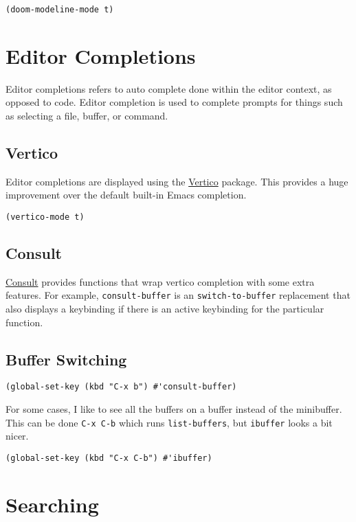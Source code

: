 \documentclass[11pt]{article}
\begin{document}
\begin{verbatim}
(doom-modeline-mode t)
\end{verbatim}
\section{Editor Completions}
\label{sec:org499d21c}

Editor completions refers to auto complete done within the editor context, as
opposed to code. Editor completion is used to complete prompts for things such
as selecting a file, buffer, or command.
\subsection{Vertico}
\label{sec:orgf2138d9}

Editor completions are displayed using the \href{https://github.com/minad/vertico}{Vertico} package. This provides a huge
improvement over the default built-in Emacs completion.

\begin{verbatim}
(vertico-mode t)
\end{verbatim}
\subsection{Consult}
\label{sec:org481e10d}

\href{https://github.com/minad/consult}{Consult} provides functions that wrap vertico completion with some extra
features. For example, \texttt{consult-buffer} is an \texttt{switch-to-buffer} replacement
that also displays a keybinding if there is an active keybinding for the
particular function.
\subsection{Buffer Switching}
\label{sec:org05ba3fd}

\begin{verbatim}
(global-set-key (kbd "C-x b") #'consult-buffer)
\end{verbatim}

For some cases, I like to see all the buffers on a buffer instead of the
minibuffer. This can be done \texttt{C-x C-b} which runs \texttt{list-buffers}, but \texttt{ibuffer}
looks a bit nicer.

\begin{verbatim}
(global-set-key (kbd "C-x C-b") #'ibuffer)
\end{verbatim}
\section{Searching}
\label{sec:orgc0a99c2}
\end{document}
